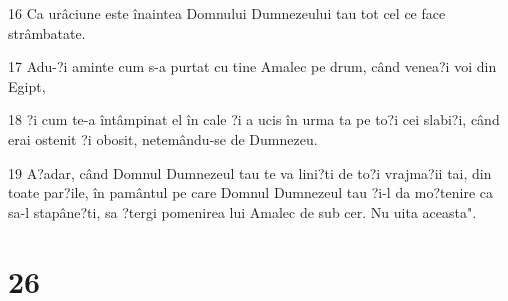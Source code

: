 \par 16 Ca urâciune este înaintea Domnului Dumnezeului tau tot cel ce face strâmbatate.
\par 17 Adu-?i aminte cum s-a purtat cu tine Amalec pe drum, când venea?i voi din Egipt,
\par 18 ?i cum te-a întâmpinat el în cale ?i a ucis în urma ta pe to?i cei slabi?i, când erai ostenit ?i obosit, netemându-se de Dumnezeu.
\par 19 A?adar, când Domnul Dumnezeul tau te va lini?ti de to?i vrajma?ii tai, din toate par?ile, în pamântul pe care Domnul Dumnezeul tau ?i-l da mo?tenire ca sa-l stapâne?ti, sa ?tergi pomenirea lui Amalec de sub cer. Nu uita aceasta".

\chapter{26}

